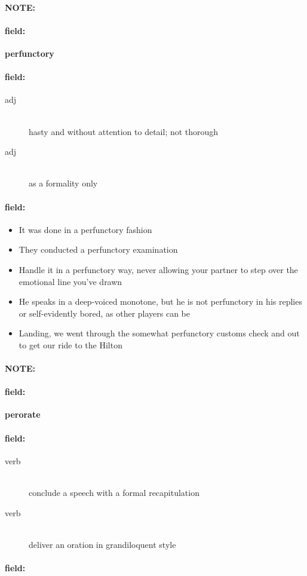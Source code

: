 \documentclass[12pt]{article}
\newenvironment{note}{\paragraph{NOTE:}}{}
\newenvironment{field}{\paragraph{field:}}{}
\begin{document}
\begin{note}
\begin{field}
\textbf{\large perfunctory}
\end{field}


\begin{field}
\begin{description}
\item[adj] \hfill \\ 
hasty and without attention to detail; not thorough

\item[adj] \hfill \\ 
as a formality only

\end{description}
\end{field}

\begin{field}
\begin{itemize}
\item It was done in a perfunctory fashion
\item They conducted a perfunctory examination
\item Handle it in a perfunctory way, never allowing your partner to step over the emotional line you've drawn
\item He speaks in a deep-voiced monotone, but he is not perfunctory in his replies or self-evidently bored, as other players can be
\item Landing, we went through the somewhat perfunctory customs check and out to get our ride to the Hilton
\end{itemize}
\end{field}
\end{note}
\begin{note}
\begin{field}
\textbf{\large perorate}
\end{field}


\begin{field}
\begin{description}
\item[verb] \hfill \\ 
conclude a speech with a formal recapitulation

\item[verb] \hfill \\ 
deliver an oration in grandiloquent style

\end{description}
\end{field}

\begin{field}
\end{field}
\end{note}
\end{document}
